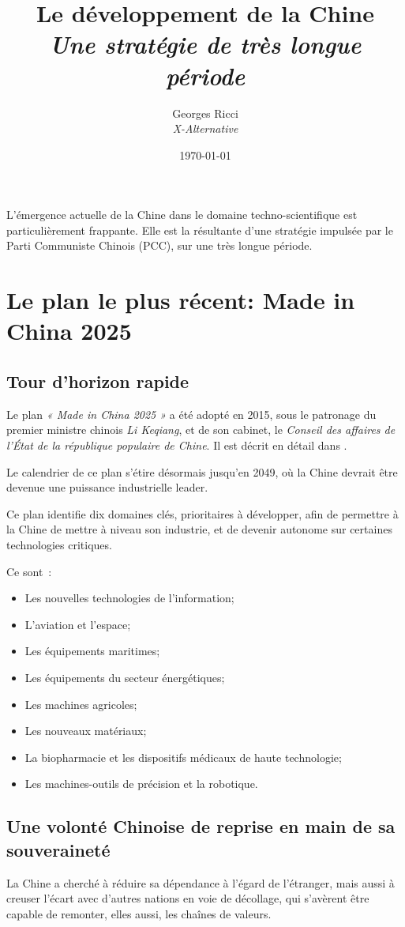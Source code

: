 \documentclass[a4paper]{article}
\author{Georges Ricci\\
\large \textit{X-Alternative}}
\date{\today}
\title{Le développement de la Chine\\ 
 \large \textit{Une stratégie de très longue période}
 }
\begin{document}
\maketitle 

\newpage
\tableofcontents
\newpage

L’émergence actuelle de la Chine dans le domaine techno-scientifique est particulièrement frappante. Elle est la résultante d’une stratégie impulsée par le Parti Communiste Chinois (PCC), sur une très longue période.

\section{Le plan le plus récent: Made in China 2025}
\label{sec:org5915e2c}
\subsection{Tour d’horizon rapide}
\label{sec:org35ecd62}
Le plan \textit{« Made in China 2025 »} a été adopté en 2015, sous le patronage du premier ministre chinois \textit{Li Keqiang}, et de son cabinet, le \textit{Conseil des affaires de l'État de la république populaire de Chine}. Il est décrit en détail dans \cite{Made_In_China_2025}. 

Le calendrier de ce plan s’étire désormais jusqu’en 2049, où la Chine devrait être devenue une puissance industrielle leader. \cite{Evolving_MiC25} 

Ce plan identifie dix domaines clés, prioritaires à développer, afin de permettre à la Chine de mettre à niveau son industrie, et de devenir autonome sur certaines technologies critiques.

Ce sont~:
\begin{itemize}
\item Les nouvelles technologies de l’information;
\item L’aviation et l’espace;
\item Les équipements maritimes;
\item Les équipements du secteur énergétiques;
\item Les machines agricoles;
\item Les nouveaux matériaux;
\item La biopharmacie et les dispositifs médicaux de haute technologie;
\item Les machines-outils de précision et la robotique.
\end{itemize}

\subsection{Une volonté Chinoise de reprise en main de sa souveraineté}
\label{sec:orgf222c4b}
La Chine a cherché à réduire sa dépendance à l’égard de l’étranger, mais aussi à creuser l’écart avec d’autres nations en voie de décollage, qui s’avèrent être capable de remonter, elles aussi, les chaînes de valeurs. 
\end{document}
